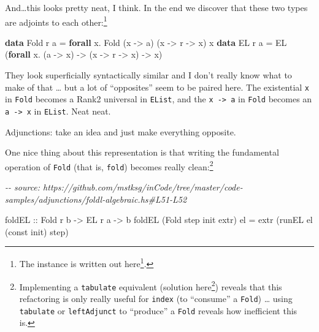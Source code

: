\documentclass[]{article}
\newenvironment{Shaded}{}{}
\newcommand{\CommentTok}[1]{\textcolor[rgb]{0.38,0.63,0.69}{\textit{#1}}}
\newcommand{\DataTypeTok}[1]{\textcolor[rgb]{0.56,0.13,0.00}{#1}}
\newcommand{\FunctionTok}[1]{\textcolor[rgb]{0.02,0.16,0.49}{#1}}
\newcommand{\KeywordTok}[1]{\textcolor[rgb]{0.00,0.44,0.13}{\textbf{#1}}}
\newcommand{\NormalTok}[1]{#1}
\newcommand{\OperatorTok}[1]{\textcolor[rgb]{0.40,0.40,0.40}{#1}}
\newcommand{\OtherTok}[1]{\textcolor[rgb]{0.00,0.44,0.13}{#1}}
\renewcommand{\href}[2]{#2\footnote{\url{#1}}}
\begin{document}
And\ldots this looks pretty neat, I think. In the end we discover that these two
types are adjoints to each other:\footnote{The instance is
  \href{https://github.com/mstksg/inCode/tree/master/code-samples/adjunctions/foldl-algebraic.hs\#L58-L71}{written
  out here}.}

\begin{Shaded}
\begin{Highlighting}[]
\KeywordTok{data} \DataTypeTok{Fold}\NormalTok{ r a }\OtherTok{=} \KeywordTok{forall}\NormalTok{ x}\OperatorTok{.} \DataTypeTok{Fold}\NormalTok{            (x }\OtherTok{{-}\textgreater{}}\NormalTok{ a)    (x }\OtherTok{{-}\textgreater{}}\NormalTok{ r }\OtherTok{{-}\textgreater{}}\NormalTok{ x)    x}
\KeywordTok{data} \DataTypeTok{EL}\NormalTok{   r a }\OtherTok{=}           \DataTypeTok{EL}\NormalTok{   (}\KeywordTok{forall}\NormalTok{ x}\OperatorTok{.}\NormalTok{ (a }\OtherTok{{-}\textgreater{}}\NormalTok{ x) }\OtherTok{{-}\textgreater{}}\NormalTok{ (x }\OtherTok{{-}\textgreater{}}\NormalTok{ r }\OtherTok{{-}\textgreater{}}\NormalTok{ x) }\OtherTok{{-}\textgreater{}}\NormalTok{ x)}
\end{Highlighting}
\end{Shaded}

They look superficially syntactically similar and I don't really know what to
make of that \ldots{} but a lot of ``opposites'' seem to be paired here. The
existential \texttt{x} in \texttt{Fold} becomes a Rank2 universal in
\texttt{EList}, and the \texttt{x\ -\textgreater{}\ a} in \texttt{Fold} becomes
an \texttt{a\ -\textgreater{}\ x} in \texttt{EList}. Neat neat.

Adjunctions: take an idea and just make everything opposite.

One nice thing about this representation is that writing the fundamental
operation of \texttt{Fold} (that is, \texttt{fold}) becomes really
clean:\footnote{Implementing a \texttt{tabulate} equivalent
  (\href{https://github.com/mstksg/inCode/tree/master/code-samples/adjunctions/foldl-algebraic.hs\#L54-L56}{solution
  here}) reveals that this refactoring is only really useful for \texttt{index}
  (to ``consume'' a \texttt{Fold}) \ldots{} using \texttt{tabulate} or
  \texttt{leftAdjunct} to ``produce'' a \texttt{Fold} reveals how inefficient
  this is.}

\begin{Shaded}
\begin{Highlighting}[]
\CommentTok{{-}{-} source: https://github.com/mstksg/inCode/tree/master/code{-}samples/adjunctions/foldl{-}algebraic.hs\#L51{-}L52}

\OtherTok{foldEL ::} \DataTypeTok{Fold}\NormalTok{ r b }\OtherTok{{-}\textgreater{}} \DataTypeTok{EL}\NormalTok{ r a }\OtherTok{{-}\textgreater{}}\NormalTok{ b}
\NormalTok{foldEL (}\DataTypeTok{Fold}\NormalTok{ step }\FunctionTok{init}\NormalTok{ extr) el }\OtherTok{=}\NormalTok{ extr (runEL el (}\FunctionTok{const} \FunctionTok{init}\NormalTok{) step)}
\end{Highlighting}
\end{Shaded}
\end{document}
